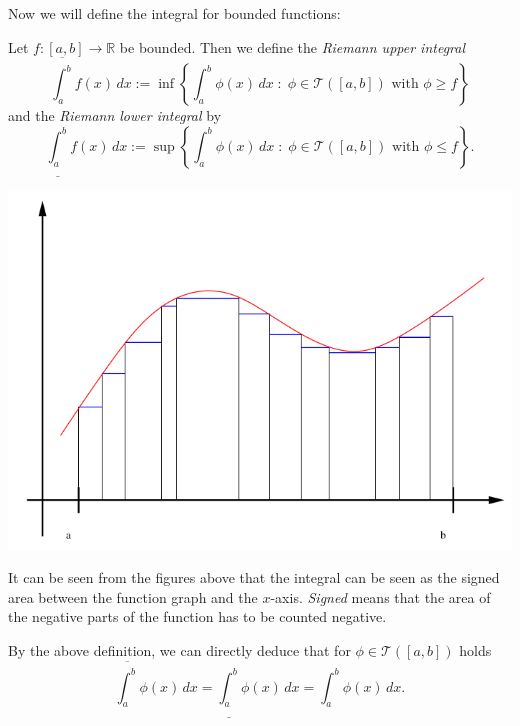 

Now we will define the integral for bounded functions:

\begin{Definition}{}
Let $f:[a,b]\to\mathbb{R}$ be bounded. Then we define the \emph{Riemann upper integral}
\[\overline{\int_a^b}f(x)\, dx:=\inf\left\{\int_a^b\phi(x)\, dx\;:\;\phi\in\mathcal{T}([a,b])\text{ with }\phi\geq f\right\}\]
and the \emph{Riemann lower integral} by
\[\underline{\int_a^b}f(x)\, dx:=\sup\left\{\int_a^b\phi(x)\, dx\;:\;\phi\in\mathcal{T}([a,b])\text{ with }\phi\leq f\right\}.\]
\end{Definition}

\includegraphics{./lower.png}


% 
It can be seen from the figures above that the integral can be seen as the signed area between the function graph and the $x$-axis. 
\emph{Signed} means that the area of the negative parts of the function has to be counted negative.


By the above definition, we can directly deduce that for $\phi\in\mathcal{T}([a,b])$ holds
\[\overline{\int_a^b}\phi(x)\, dx=\underline{\int_a^b}\phi(x)\, dx={\int_a^b}\phi(x)\, dx.\]

